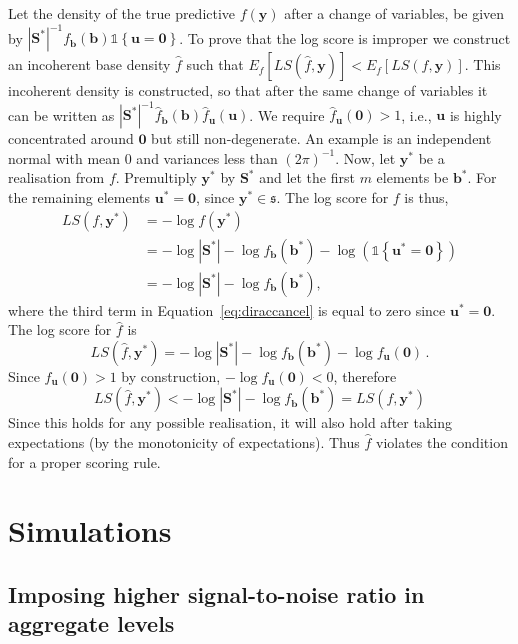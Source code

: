 \documentclass[12pt]{article}
\theoremstyle{definition}
\begin{document}
Let the density of the true predictive $f(\bm{y})$ after a change of variables, be given by $|\bm{S^*}|^{-1}f_{\bm b}(\bm{b})\mathbb{1}\left\{\bm{u}=\bm{0}\right\}$.  To prove that the log score is improper we construct an incoherent base density $\hat{f}$ such that $E_f\left[LS\left(\hat{f},\bm{y}\right)\right]<E_f\left[LS\left(f,\bm{y}\right)\right]$. This incoherent density is constructed, so that after the same change of variables it can be written as $|\bm{S^*}|^{-1}\hat{f}_{\bm b}(\bm{b})\hat{f}_{\bm{u}}(\bm{u})$. We require $\hat{f}_{\bm u}(\bm{0})>1$, i.e., ${\bm u}$ is highly concentrated around $\bm{0}$ but still non-degenerate. An example is an independent normal with mean 0 and variances less than $(2\pi)^{-1}$. Now, let $\bm{y}^*$ be a realisation from $f$. Premultiply $\bm{y}^*$ by $\bm{S}^*$ and let the first $m$ elements be $\bm{b^*}$.  For the remaining elements ${\bm u}^*={\bm 0}$, since $\bm{y}^*\in\mathfrak{s}$.  The log score for $f$ is thus,	
\begin{align}
LS\left(f,\bm{y}^*\right) &= -\log f(\bm{y}^*) \nonumber\\
&=-\log|\bm{S^*}|-\log f_{\bm{b}}\left(\bm{b}^*\right)-\log\left(\mathbb{1}\left\{\bm{u}^*=\bm{0}\right\}\right)\label{eq:diraccancel}\\
&=-\log|\bm{S^*}|-\log f_{\bm{b}}\left(\bm{b}^*\right),\nonumber
\end{align}
where the third term in Equation~\ref{eq:diraccancel} is equal to zero since $\bm{u}^*=\bm{0}$.  The log score for $\hat{f}$ is
\[
LS\left(\hat{f},\bm{y}^*\right) = -\log|\bm{S^*}|-\log f_{\bm{b}}(\bm{b}^*)- \log f_{\bm u}(\bm{0})\,.
\]
Since $f_{\bm u}(\bm{0})>1$ by construction, $-\log f_{\bm u}(\bm{0})<0$, therefore
\[
LS\left(\hat{f},\bm{y}^*\right) <-\log|\bm{S^*}|-\log f_{\bm b}(\bm{b}^*)=LS\left(f,\bm{y}^*\right)
\]
Since this holds for any possible realisation, it will also hold after taking expectations (by the monotonicity of expectations).  Thus $\hat{f}$ violates the condition for a proper scoring rule.



\section{Simulations}

\subsection{Imposing higher signal-to-noise ratio in aggregate levels}\label{Append:sig-to-noise}
\end{document}
